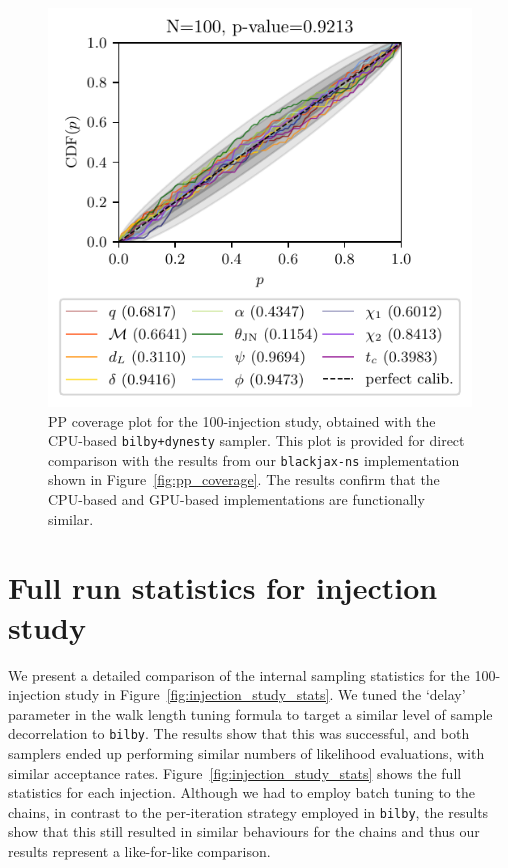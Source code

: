\documentclass[fleqn,usenatbib]{mnras}
\begin{document}
\begin{figure}
    \centering
    \includegraphics[width=\columnwidth]{figures/pp_coverage_bilby.pdf}
    \caption{PP coverage plot for the 100-injection study, obtained
    with the CPU-based \texttt{bilby+dynesty} sampler. This plot is
    provided for direct comparison with the results from our
    \texttt{blackjax-ns} implementation shown in
    Figure~\ref{fig:pp_coverage}. The results confirm that the CPU-based
    and GPU-based implementations are functionally similar.}
    \label{fig:pp_coverage_bilby}
\end{figure}

\section{Full run statistics for injection study}
\label{app:injection_study_stats}

We present a detailed comparison of the internal sampling statistics for
the 100-injection study in Figure~\ref{fig:injection_study_stats}.
We tuned the `delay' parameter in the walk length tuning formula to
target a similar level of sample decorrelation to \texttt{bilby}.
The results show that this was successful, and both samplers ended up
performing similar numbers of likelihood evaluations, with similar acceptance rates.
Figure~\ref{fig:injection_study_stats} shows the full statistics for each injection.
Although we had to employ batch tuning to the chains, in contrast to the per-iteration
strategy employed in \texttt{bilby}, the results show that this still resulted in 
similar behaviours for the chains and thus our results represent a like-for-like comparison.
\end{document}
